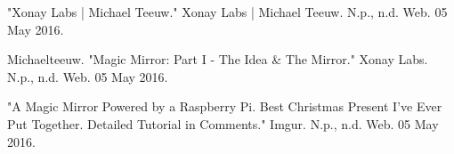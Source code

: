\documentclass[conference]{IEEEtran}
\begin{document}

%
%
%
\begin{thebibliography}{1}

  "Xonay Labs | Michael Teeuw." Xonay Labs | Michael Teeuw. N.p., n.d. Web. 05 May 2016.
  
  Michaelteeuw. "Magic Mirror: Part I - The Idea & The Mirror." Xonay Labs. N.p., n.d. Web. 05 May 2016.
 
  "A Magic Mirror Powered by a Raspberry Pi. Best Christmas Present I've Ever Put Together. Detailed Tutorial in Comments." Imgur. N.p., n.d. Web. 05 May 2016.


\end{thebibliography}
\end{document}
